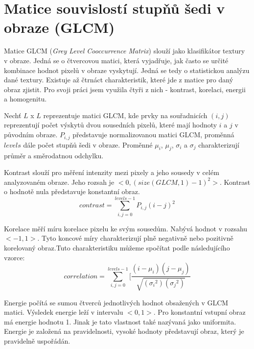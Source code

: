 




%

\section{Matice souvislostí stupňů šedi v obraze (GLCM)}
Matice GLCM (\textit{Grey Level Cooccurrence Matrix}) slouží jako klasifikátor textury v obraze. Jedná se o čtvercovou matici, která vyjadřuje, jak často se určité kombinace hodnot pixelů v obraze vyskytují. Jedná se tedy o statistickou analýzu dané textury. Existuje až čtrnáct charakteristik, které jde z matice pro daný obraz zjistit. Pro svoji práci jsem využila čtyři z nich - kontrast, korelaci, energii a homogenitu.

Nechť $L$ x $L$ reprezentuje matici GLCM, kde prvky na souřadnicích $(i,j)$ reprezentují počet výskytů dvou sousedních pixelů, které mají hodnoty $i$ a $j$ v původním obraze. $P_{i,j}$ představuje normalizovanou matici GLCM, proměnná $levels$ dále počet stupňů šedi v obraze. Proměnné $\mu_i$, $\mu_j$, $\sigma_i$ a $\sigma_j$ charakterizují průměr a směrodatnou odchylku.\cite{TouchlessANN}

Kontrast slouží pro měření intenzity mezi pixely a jeho sousedy v celém analyzovaném obraze. Jeho rozsah je $<0, (size(GLCM,1)-1)^2>$. Kontrast o hodnotě nula představuje konstantní obraz.\cite{MatlabGLCM}\cite{ScikitGLCM}
$$contrast = \sum_{i,j=0}^{levels-1}P_{i,j}(i-j)^2$$

Korelace měří míru korelace pixelu ke svým sousedům. Nabývá hodnot v rozsahu $<-1, 1>$. Tyto koncové míry charakterizují plně negativně nebo pozitivně korelovaný obraz.\cite{MatlabGLCM}Tuto charakteristiku můžeme spočítat podle následujícího vzorce:\cite{ScikitGLCM}
$$correlation = \sum_{i,j=0}^{levels-1}[\frac{(i-\mu_i)(j-\mu_j)}{\sqrt{({\sigma_i}^2)({\sigma_j}^2)}}$$

Energie počítá se sumou čtverců jednotlivých hodnot obsažených v GLCM matici. Výsledek energie leží v intervalu $<0, 1>$. Pro konstantní vstupní obraz má energie hodnotu 1. Jinak je tato vlastnost také nazývaná jako uniformita. Energie je založená na pravidelnosti, vysoké hodnoty představují obraz, který je pravidelně uspořádán.\cite{MatlabGLCM}


